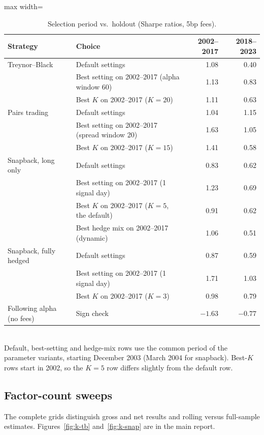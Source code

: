\documentclass[11pt,letterpaper]{article}
\begin{document}
\begin{table}[!htbp]
\centering
\caption{Selection period vs.\ holdout (Sharpe ratios, 5bp fees).}
\label{tab:holdout}
\begin{adjustbox}{max width=\linewidth}
\begin{tabular}{llrr}
\toprule
Strategy & Choice & 2002--2017 & 2018--2023 \\
\midrule
Treynor--Black & Default settings & 1.08 & 0.40 \\
& Best setting on 2002--2017 (alpha window 60) & 1.13 & 0.83 \\
& Best $K$ on 2002--2017 ($K = 20$) & 1.11 & 0.63 \\
Pairs trading & Default settings & 1.04 & 1.15 \\
& Best setting on 2002--2017 (spread window 20) & 1.63 & 1.05 \\
& Best $K$ on 2002--2017 ($K = 15$) & 1.41 & 0.58 \\
Snapback, long only & Default settings & 0.83 & 0.62 \\
& Best setting on 2002--2017 (1 signal day) & 1.23 & 0.69 \\
& Best $K$ on 2002--2017 ($K = 5$, the default) & 0.91 & 0.62 \\
& Best hedge mix on 2002--2017 (dynamic) & 1.06 & 0.51 \\
Snapback, fully hedged & Default settings & 0.87 & 0.59 \\
& Best setting on 2002--2017 (1 signal day) & 1.71 & 1.03 \\
& Best $K$ on 2002--2017 ($K = 3$) & 0.98 & 0.79 \\
\midrule
Following alpha (no fees) & Sign check & $-1.63$ & $-0.77$ \\
\bottomrule
\end{tabular}
\end{adjustbox}
\\[4pt]
\small Default, best-setting and hedge-mix rows use the common period of the parameter variants, starting December 2003 (March 2004 for snapback). Best-$K$ rows start in 2002, so the $K = 5$ row differs slightly from the default row.
\end{table}

\FloatBarrier
\subsection{Factor-count sweeps}
The complete grids distinguish gross and net results and rolling versus full-sample estimates. Figures~\ref{fig:k-tb} and~\ref{fig:k-snap} are in the main report.
\end{document}
